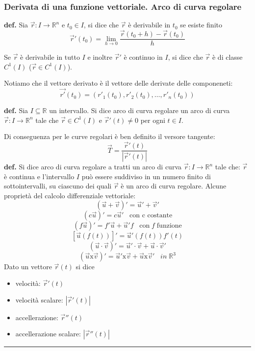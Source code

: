 \subsubsection*{Derivata di una funzione vettoriale. Arco di curva regolare}
\textbf{def.} Sia $\vec{r}: I \rightarrow \mathbb{R}^n$ e $t_0 \in I$, si dice che $\vec{r}$ è derivabile in $t_0$ se esiste finito
\[
    \vec{r}'(t_0) = \lim_{h\rightarrow 0}\frac{\vec{r}(t_0 +h) - \vec{r}(t_0)}{h}
\]
\begin{tcolorbox}
Se $\vec{r}$ è derivabile in tutto $I$ e inoltre $\vec{r}'$ è continuo in $I$, si dice che $\vec{r}$ è di classe $C^1(I)$ ($\vec{r}\in C^1(I)$).
\end{tcolorbox}
Notiamo che il vettore derivato è il vettore delle derivate delle componeneti:
\[
    \vec{r'}(t_0) = (r'_1(t_0), r'_2(t_0), \dots, r'_n(t_0))
\]
\begin{tcolorbox}
\textbf{def.} Sia $I \subseteq \mathbb{R}$ un intervallo. Si dice arco di curva regolare un arco di curva $\vec{r}: I \rightarrow  \mathbb{R}^n$ tale che $\vec{r} \in C^1(I)$ e $\vec{r}'(t) \neq 0$ per ogni $t \in I$.
\end{tcolorbox}
Di conseguenza per le curve regolari è ben definito il versore tangente:
\[
    \vec{T} = \frac{\vec{r}'(t)}{|\vec{r}'(t)|}
\]
\textbf{def.} Si dice arco di curva regolare a tratti un arco di curva $\vec{r} : I \rightarrow \mathbb{R}^n$ tale che: $\vec{r}$ è continua e l'intervallo $I$ può essere suddiviso in un numero finito di sottointervalli, su ciascuno dei quali $\vec{r}$ è un arco di curva regolare.\newline
\newline
Alcune proprietà del calcolo differenziale vettoriale:
\[
    (\vec{u} + \vec{v})' = \vec{u}' + \vec{v}'
\]
\[
    (c \vec{u})' = c \vec{u}' \;\;\; \text{con c costante}
\]
\[
    (f \vec{u})' = f' \vec{u} + \vec{u}' f \;\;\;\text{con} \; f \; \text{funzione}
\]
\[
    [\vec{u}(f(t))]' = \vec{u}'(f(t))f'(t)
\]
\[
    (\vec{u} \cdot \vec{v})' = \vec{u}' \cdot  \vec{v} + \vec{u} \cdot  \vec{v}'
\]
\[
    (\vec{u} \text{x} \vec{v})' = \vec{u}' \text{x} \vec{v} + \vec{u} \text{x} \vec{v}' \;\;\; in \;\mathbb{R}^3
\]
Dato un vettore $\vec{r}(t)$ si dice
\begin{itemize}
    \item velocità: $\vec{r}'(t)$
    \item velocità scalare: $|\vec{r}'(t)|$
    \item accellerazione: $\vec{r}''(t)$
    \item accellerazione scalare: $|\vec{r}''(t)|$
\end{itemize}
\rule{\textwidth}{0,4pt}
